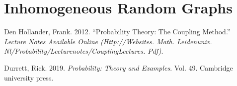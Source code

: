 \documentclass[
  letterpaper,
  DIV=11,
  numbers=noendperiod]{scrartcl}
\newlength{\cslhangindent}
\newenvironment{CSLReferences}[2] %
 {\begin{list}{}{%
  \setlength{\itemindent}{0pt}
  \setlength{\leftmargin}{0pt}
  \setlength{\parsep}{0pt}
  \ifodd #1
   \setlength{\leftmargin}{\cslhangindent}
   \setlength{\itemindent}{-1\cslhangindent}
  \fi
  \setlength{\itemsep}{#2\baselineskip}}}
 {\end{list}}
\begin{document}
\section*{Inhomogeneous Random
Graphs}\label{inhomogeneous-random-graphs}

\label{refs}
\begin{CSLReferences}{1}{0}
Den Hollander, Frank. 2012. {``Probability Theory: The Coupling
Method.''} \emph{Lecture Notes Available Online (Http://Websites. Math.
Leidenuniv. Nl/Probability/Lecturenotes/CouplingLectures. Pdf)}.

Durrett, Rick. 2019. \emph{Probability: Theory and Examples}. Vol. 49.
Cambridge university press.

\end{CSLReferences}
\end{document}
